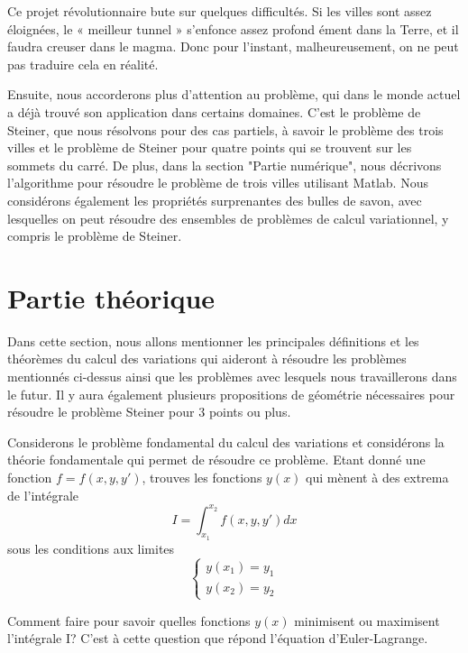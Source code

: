 \documentclass[10pt,a4paper]{article}%
\theoremstyle{theorem}
\theoremstyle{definition}
\begin{document}
	Ce projet révolutionnaire bute sur quelques difficultés. Si les villes sont assez  éloignées, le « meilleur tunnel » s'enfonce assez profond ément dans la Terre, et il faudra creuser dans le magma. Donc pour l'instant, malheureusement, on ne peut pas traduire cela en réalité.
	 
	Ensuite, nous accorderons plus d'attention au problème, qui dans le monde actuel a déjà trouvé son application dans certains domaines. C'est le problème de Steiner, que nous résolvons pour des cas partiels, à savoir le problème des trois villes et le problème de Steiner pour quatre points qui se trouvent sur les sommets du carré. De plus, dans la section "Partie numérique", nous décrivons l'algorithme pour résoudre le problème de trois villes utilisant Matlab. Nous considérons également les propriétés surprenantes des bulles de savon, avec lesquelles on peut résoudre des ensembles de problèmes de calcul variationnel, y compris le problème de Steiner.

	
	\section{Partie théorique}
	
	Dans cette section, nous allons mentionner les principales définitions et les théorèmes du calcul des variations qui aideront à résoudre les problèmes mentionnés ci-dessus ainsi que les problèmes avec lesquels nous travaillerons dans le futur. Il y aura également plusieurs propositions de géométrie nécessaires pour résoudre le problème Steiner pour 3 points ou plus.
	

	Considerons le problème fondamental du calcul des variations et considérons la théorie fondamentale qui permet de résoudre  ce problème.
	Etant donné une fonction $f=f(x,y,y')$, trouves les fonctions $y(x)$ qui mènent à des extrema de l'intégrale \[I=\int_{x_1}^{x_2} f(x,y,y')dx\] sous les conditions aux limites 
	\begin{equation*}
		\begin{cases}
			y(x_1)=y_1
		 	\\
			y(x_2)=y_2
		\end{cases}
	\end{equation*}
		 
	Comment faire pour savoir quelles fonctions $y(x)$ minimisent ou maximisent l'intégrale I? C'est à cette question que répond l'équation d'Euler-Lagrange.
		 
\end{document}
